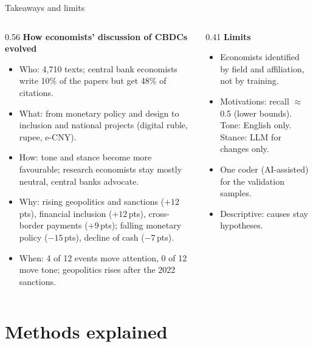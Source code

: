 \documentclass[aspectratio=169,10pt]{beamer}
\begin{document}
\begin{frame}{Takeaways and limits}
\begin{columns}[T]
\begin{column}{0.56\textwidth}\footnotesize
\textbf{How economists' discussion of CBDCs evolved}
\begin{itemize}\setlength\itemsep{1pt}
\item \alert{Who:} 4,710 texts; central bank economists write 10\% of the papers but get 48\% of citations.
\item \alert{What:} from monetary policy and design to inclusion and national projects (digital ruble, rupee, e-CNY).
\item \alert{How:} tone and stance become more favourable; research economists stay mostly neutral, central banks advocate.
\item \alert{Why:} rising geopolitics and sanctions ($+12$\,pts), financial inclusion ($+12$\,pts), cross-border payments ($+9$\,pts); falling monetary policy ($-15$\,pts), decline of cash ($-7$\,pts).
\item \alert{When:} 4 of 12 events move attention, 0 of 12 move tone; geopolitics rises after the 2022 sanctions.
\end{itemize}
\end{column}
\begin{column}{0.41\textwidth}\footnotesize
\textbf{Limits}
\begin{itemize}\setlength\itemsep{1pt}
\item Economists identified by field and affiliation, not by training.
\item Motivations: recall $\approx$ 0.5 (lower bounds). Tone: English only. Stance: LLM for changes only.
\item One coder (AI-assisted) for the validation samples.
\item Descriptive: causes stay hypotheses.
\end{itemize}
\end{column}
\end{columns}
\end{frame}

\appendix
\section*{Methods explained}
\end{document}
